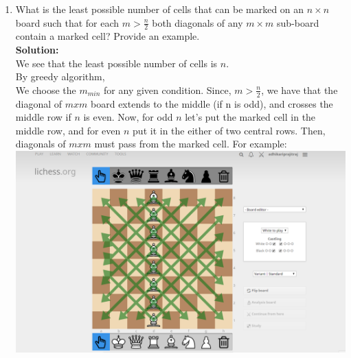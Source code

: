 \documentclass{article}
\begin{document}
\begin{enumerate}
\item   What is the least possible number of cells that can be marked on an $n × n$ board such that for each $m > \frac{n}{2}$ both diagonals of any $m × m$ sub-board contain a marked cell? Provide an example.\\
\textbf{Solution:}\\
We see that the least possible number of cells is $n$.\\
By greedy algorithm,\\
We choose the $m_{min}$ for any given condition.
Since, $m > \frac{n}{2}$, we have that the diagonal of $mxm$ board extends to the middle (if n is odd), and crosses the middle row if $n$ is even. Now, for odd $n$ let's put the marked cell in the middle row, and for even $n$ put it in the either of two central rows. Then, diagonals of $mxm$ must pass from the marked cell. For example:\\
\includegraphics[width=\textwidth]{chess.PNG}







\end{enumerate}
\end{document}
